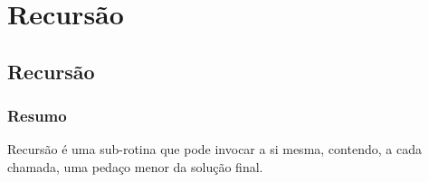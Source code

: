 
\part[Recursão]
{Recursão}


\chapter[Recursão]
{Recursão}



\section*{Resumo}

Recursão é uma sub-rotina que pode invocar a si mesma, contendo, a cada chamada, uma pedaço menor da solução final.

%
%







